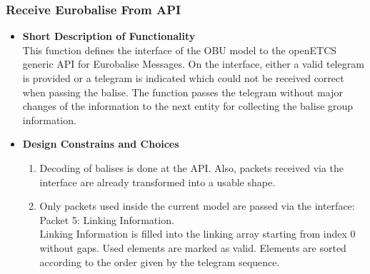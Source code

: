
\subsubsection{Receive Eurobalise From API}
\begin{itemize}
\item \textbf{Short Description of Functionality}\\
This function defines the interface of the OBU model to the openETCS generic API for Eurobalise Messages. On the interface, either a valid telegram is provided or a telegram is indicated which could not be received correct when passing the balise. The function passes the telegram without major changes of the information to the next entity for collecting the balise group information.

\item \textbf{Design Constrains and Choices}\\
\begin{enumerate}
\item Decoding of balises is done at the API. Also, packets received via the interface are already transformed into a usable shape.
\item Only packets used inside the current model are passed via the interface:\\
	Packet 5: Linking Information.\\
	Linking Information is filled into the linking array starting from index 0 without gaps. Used elements are marked as valid. Elements are sorted according to the order given by the telegram sequence.
\end{enumerate}
\end{itemize}


